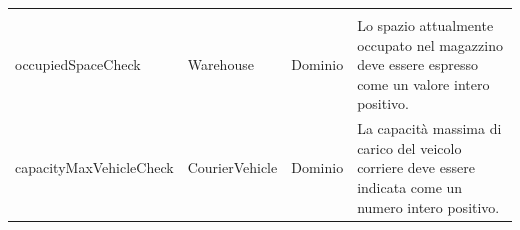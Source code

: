 \begin{tabularx}{\textwidth}{YYYY}
\begin{minipage}[c]{\linewidth}
  \end{minipage} \\
  occupiedSpaceCheck & Warehouse & Dominio &
  \begin{minipage}[c]{\linewidth}
    \vspace{0.5cm}
    Lo spazio attualmente occupato nel magazzino deve essere espresso come un valore intero positivo. \newline
  \end{minipage} \\
  capacityMaxVehicleCheck & CourierVehicle & Dominio &
  \begin{minipage}[c]{\linewidth}
    \vspace{0.5cm}
    La capacità massima di carico del veicolo corriere deve essere indicata come un numero intero positivo. \newline
  \end{minipage} \\
  \bottomrule
\end{tabularx}

